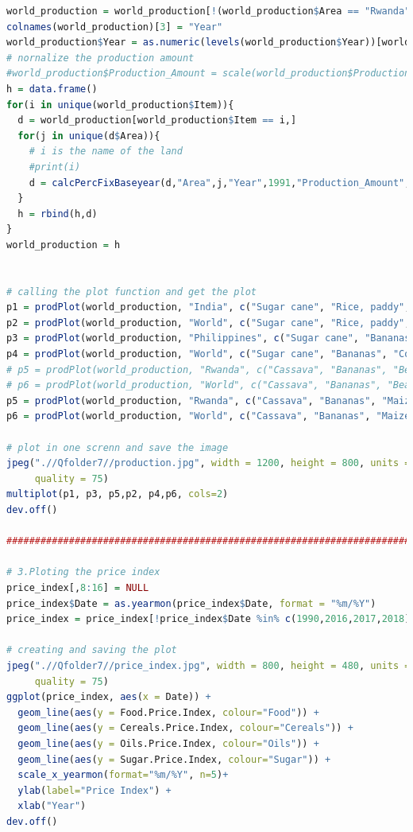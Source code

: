 \documentclass[11pt]{article}
\begin{document}
\begin{lstlisting}[language= R]
world_production = world_production[!(world_production$Area == "Rwanda" & world_production$Item %in% c("Wheat", "Sugar cane", "Coconuts")),]
colnames(world_production)[3] = "Year"
world_production$Year = as.numeric(levels(world_production$Year))[world_production$Year] 
# nornalize the production amount
#world_production$Production_Amount = scale(world_production$Production_Amount)
h = data.frame()
for(i in unique(world_production$Item)){
  d = world_production[world_production$Item == i,]
  for(j in unique(d$Area)){
    # i is the name of the land 
    #print(i)
    d = calcPercFixBaseyear(d,"Area",j,"Year",1991,"Production_Amount", "Percentage")
  }
  h = rbind(h,d)
}
world_production = h


# calling the plot function and get the plot
p1 = prodPlot(world_production, "India", c("Sugar cane", "Rice, paddy", "Wheat", "Potatoes"))
p2 = prodPlot(world_production, "World", c("Sugar cane", "Rice, paddy", "Wheat", "Potatoes"))
p3 = prodPlot(world_production, "Philippines", c("Sugar cane", "Bananas", "Coconuts", "Rice, paddy"))
p4 = prodPlot(world_production, "World", c("Sugar cane", "Bananas", "Coconuts", "Rice, paddy"))
# p5 = prodPlot(world_production, "Rwanda", c("Cassava", "Bananas", "Beans, dry", "Maize", "Sweet potatoes", "Potatoes", "Rice, paddy"))
# p6 = prodPlot(world_production, "World", c("Cassava", "Bananas", "Beans, dry", "Maize", "Sweet potatoes", "Potatoes", "Rice, paddy"))
p5 = prodPlot(world_production, "Rwanda", c("Cassava", "Bananas", "Maize", "Sweet potatoes"))
p6 = prodPlot(world_production, "World", c("Cassava", "Bananas", "Maize", "Sweet potatoes"))

# plot in one screnn and save the image 
jpeg(".//Qfolder7//production.jpg", width = 1200, height = 800, units = "px", pointsize = 12,
     quality = 75)
multiplot(p1, p3, p5,p2, p4,p6, cols=2)
dev.off()

#####################################################################################################

# 3.Ploting the price index 
price_index[,8:16] = NULL
price_index$Date = as.yearmon(price_index$Date, format = "%m/%Y")
price_index = price_index[!price_index$Date %in% c(1990,2016,2017,2018),]

# creating and saving the plot
jpeg(".//Qfolder7//price_index.jpg", width = 800, height = 480, units = "px", pointsize = 12,
     quality = 75)
ggplot(price_index, aes(x = Date)) +
  geom_line(aes(y = Food.Price.Index, colour="Food")) +
  geom_line(aes(y = Cereals.Price.Index, colour="Cereals")) +
  geom_line(aes(y = Oils.Price.Index, colour="Oils")) +
  geom_line(aes(y = Sugar.Price.Index, colour="Sugar")) +
  scale_x_yearmon(format="%m/%Y", n=5)+
  ylab(label="Price Index") +
  xlab("Year")
dev.off()


\end{lstlisting}
\end{document}
